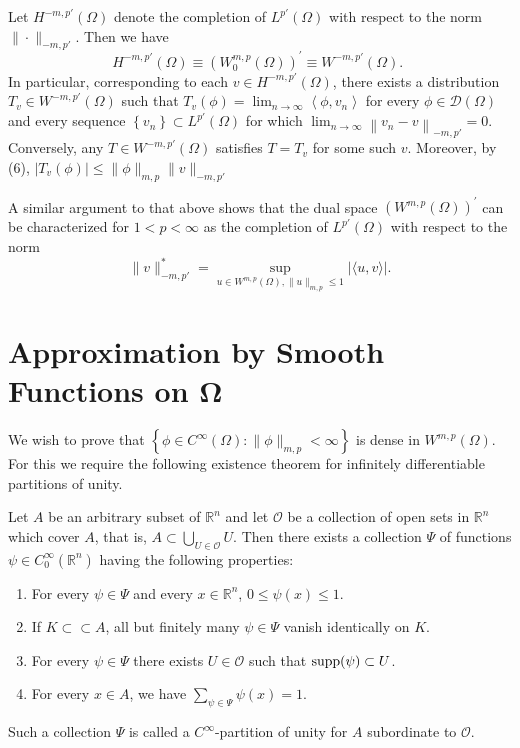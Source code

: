\begin{para}
  Let $H^{-m, p'}(\Omega)$ denote the completion of $L^{p'}(\Omega)$
  with respect to the norm $\|\cdot\|_{-m, p'}$. Then we have
  \[
  H^{-m, p'}(\Omega) \equiv\left(W_0^{m, p}(\Omega)\right)^{\prime} \equiv W^{-m, p'}(\Omega) \text {. }
  \]
  In particular, corresponding to each $v \in H^{-m, p'}(\Omega)$, there exists a 
  distribution $T_v \in W^{-m, p'}(\Omega)$ such that
  $T_v(\phi)=\lim _{n \rightarrow \infty}\left\langle\phi, v_n\right\rangle$
  for every $\phi \in \mathscr{D}(\Omega)$ and every sequence
  $\left\{v_n\right\} \subset L^{p'}(\Omega)$ for which
  $\lim _{n \rightarrow \infty}\left\|v_n-v\right\|_{-m, p'}=0$.
  Conversely, any $T \in W^{-m, p'}(\Omega)$ satisfies $T=T_v$ for some such $v$.
  Moreover, by (6), $\left|T_v(\phi)\right| \leq\|\phi\|_{m,p}\|v\|_{-m, p'}$
\end{para}

\begin{para}
  A similar argument to that above shows that the dual space $\left(W^{m,p}(\Omega)\right)^{\prime}$ can be characterized for $1<p<\infty$ as the completion of $L^{p'}(\Omega)$ with respect to the norm
  \[
  \|v\|_{-m, p'}^*
    = \sup _{u \in W^{m,p}(\Omega),\|u\|_{m,p} \leq 1}|\langle u, v\rangle|.
  \]
\end{para}


\section[Approximation by Smooth Functions on $\Omega$]%
  {Approximation by Smooth Functions on $\bm{\Omega}$}

We wish to prove that $\left\{\phi \in C^{\infty}(\Omega):\|\phi\|_{m,p}<\infty\right\}$
is dense in $W^{m,p}(\Omega)$. For this we require the following existence theorem for
infinitely differentiable partitions of unity.

\begin{theorem}
  Let $A$ be an arbitrary subset of $\mathbb{R}^n$ and let $\mathscr{O}$ be a collection of open 
  sets in $\mathbb{R}^n$ which cover $A$, that is, $A \subset \bigcup_{U \in \mathscr{O}} U$.
  Then there exists a collection $\Psi$ of functions $\psi \in C_0^{\infty}\left(\mathbb{R}^n\right)$ having the following properties:
  \begin{enumerate}[label = (\roman*)]
    \item For every $\psi \in \Psi$ and every $x \in \mathbb{R}^n$, $0 \leq \psi(x) \leq 1$.
    \item If $K \subset\subset A$, all but finitely many $\psi \in \Psi$ vanish identically on $K$.
    \item For every $\psi \in \Psi$ there exists $U \in \mathscr{O}$ such that $\operatorname{supp}(\psi) \subset U$.
    \item For every $x \in A$, we have $\sum_{\psi \in \Psi} \psi(x)=1$.
  \end{enumerate}
  Such a collection $\Psi$ is called a $C^{\infty}$-partition of unity for $A$ subordinate to $\mathscr{O}$.
\end{theorem}

